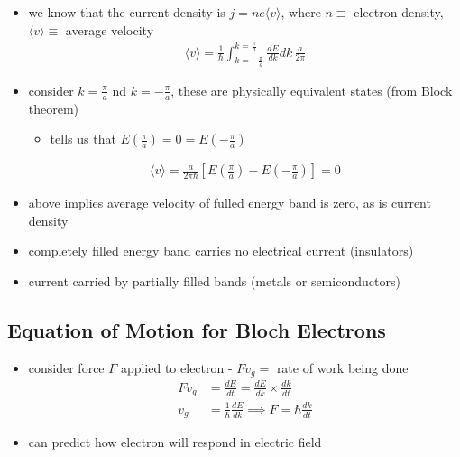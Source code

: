 \documentclass[a4paper,11pt,normalem]{article}
\begin{document}
\begin{itemize}
    \item we know that the current density is \(j = ne\langle v\rangle\), where \(n \equiv\) electron density, \(\langle v\rangle \equiv\) average velocity
        \begin{align*}
            \langle v\rangle = \frac{1}{\hbar}\int_{k=-\frac{\pi}{a}}^{k=\frac{\pi}{a}} \frac{dE}{dk}dk\,\frac{a}{2\pi}
        \end{align*}
    \item consider \(k = \frac{\pi}{a}\) nd \(k = -\frac{\pi}{a}\), these are physically equivalent states (from Block theorem)
        \begin{itemize}
            \item tells us that \(E\left(\frac{\pi}{a}\right) = 0 = E\left(-\frac{\pi}{a}\right)\)
        \end{itemize}
        \begin{align*}
            \langle v\rangle = \frac{a}{2\pi\hbar}\left[E\left(\frac{\pi}{a}\right) - E\left(-\frac{\pi}{a}\right)\right] = 0
        \end{align*}
    \item above implies average velocity of fulled energy band is zero, as is current density
    \item completely filled energy band carries no electrical current (insulators)
    \item current carried by partially filled bands (metals or semiconductors)
\end{itemize}

\subsection{Equation of Motion for Bloch Electrons}

\begin{itemize}
    \item consider force \(F\) applied to electron - \(Fv_g =\) rate of work being done
        \begin{align*}
            Fv_g &= \frac{dE}{dt} = \frac{dE}{dk}  \times \frac{dk}{dt} \\
            v_g &= \frac{1}{\hbar}\frac{dE}{dk} \implies F = \hbar\frac{dk}{dt}
        \end{align*}
    \item can predict how electron will respond in electric field
\end{itemize}
\end{document}
